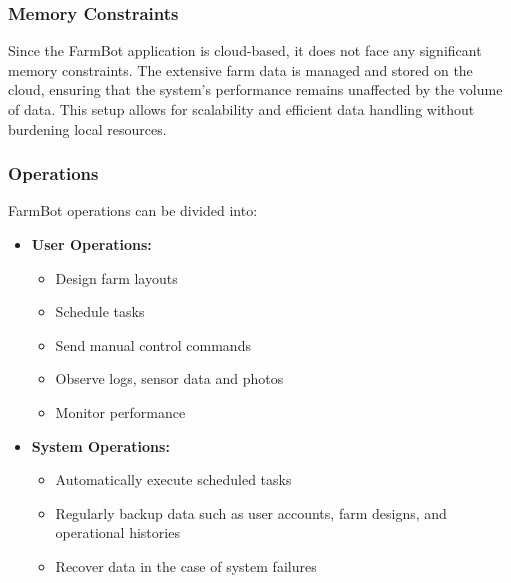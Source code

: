 \subsubsection{Memory Constraints}
Since the FarmBot application is cloud-based, it does not face any significant memory constraints. The extensive farm data is managed and stored on the cloud, ensuring that the system's performance remains unaffected by the volume of data. This setup allows for scalability and efficient data handling without burdening local resources.

\subsubsection{Operations}
FarmBot operations can be divided into:
\begin{itemize}
    \item \textbf{User Operations:}
    \begin{itemize}
        \item Design farm layouts
        \item Schedule tasks
        \item Send manual control commands
        \item Observe logs, sensor data and photos
        \item Monitor performance
    \end{itemize}
    \item \textbf{System Operations:}
    \begin{itemize}
        \item Automatically execute scheduled tasks
        \item Regularly backup data such as user accounts, farm designs, and operational histories
        \item Recover data in the case of system failures
    \end{itemize}
\end{itemize}


